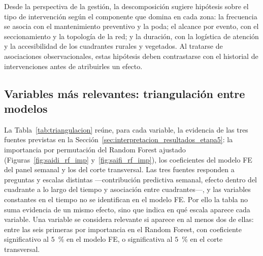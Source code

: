 Desde la perspectiva de la gestión, la descomposición sugiere hipótesis sobre el tipo de intervención según el componente que domina en cada zona: la frecuencia se asocia con el mantenimiento preventivo y la poda; el alcance por evento, con el seccionamiento y la topología de la red; y la duración, con la logística de atención y la accesibilidad de los cuadrantes rurales y vegetados. Al tratarse de asociaciones observacionales, estas hipótesis deben contrastarse con el historial de intervenciones antes de atribuirles un efecto.

\subsection{Variables más relevantes: triangulación entre modelos}
\label{sec:resultados_triangulacion}

La Tabla~\ref{tab:triangulacion} reúne, para cada variable, la evidencia de las tres fuentes previstas en la Sección~\ref{sec:interpretacion_resultados_etapa5}: la importancia por permutación del Random Forest ajustado (Figuras~\ref{fig:saidi_rf_imp} y~\ref{fig:saifi_rf_imp}), los coeficientes del modelo FE del panel semanal y los del corte transversal. Las tres fuentes responden a preguntas y escalas distintas ---contribución predictiva semanal, efecto dentro del cuadrante a lo largo del tiempo y asociación entre cuadrantes---, y las variables constantes en el tiempo no se identifican en el modelo FE. Por ello la tabla no suma evidencia de un mismo efecto, sino que indica en qué escala aparece cada variable. Una variable se considera relevante si aparece en al menos dos de ellas: entre las seis primeras por importancia en el Random Forest, con coeficiente significativo al $5$~\% en el modelo FE, o significativa al $5$~\% en el corte transversal.

